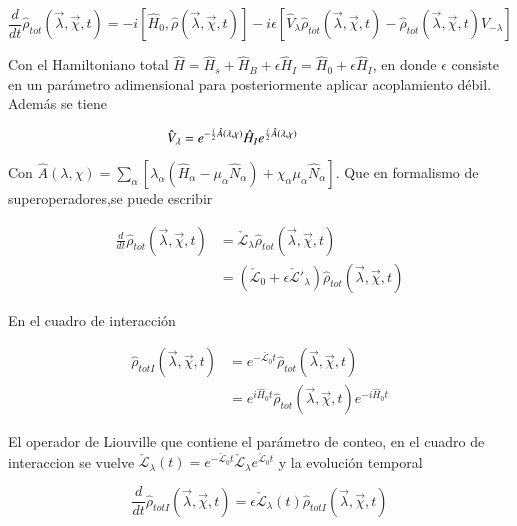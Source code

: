 \begin{equation*}
    \frac{d}{dt}\hat{\rho}_{tot}(\vec{\lambda},\vec{\chi},t) = -i[\hat{H}_{0},\hat{\rho}(\vec{\lambda},\vec{\chi},t)] - i\epsilon[\hat{V}_{\lambda} \hat{\rho}_{tot}(\vec{\lambda},\vec{\chi},t) - \hat{\rho}_{tot}(\vec{\lambda},\vec{\chi},t)\hat{V}_{-\lambda}]
\end{equation*}

Con el Hamiltoniano total $\hat{H} = \hat{H}_{s} + \hat{H}_{B} + \epsilon \hat{H}_{I} = \hat{H}_{0} + \epsilon \hat{H}_{I}$, en donde $\epsilon$ consiste en un parámetro adimensional para posteriormente aplicar acoplamiento débil. Además se tiene

\begin{equation*}
    \hat{V}_{\lambda} = e^{-\frac{i}{2}\hat{A}(\lambda,\chi)}\hat{H}_{I}e^{\frac{i}{2}\hat{A}(\lambda,\chi)} \hspace{14mm}  
\end{equation*}

Con $\hat{A}(\lambda,\chi) = \sum_{\alpha}[\lambda_{\alpha}(\hat{H}_{\alpha} - \mu_{\alpha}\hat{N}_{\alpha}) + \chi_{\alpha}\mu_{\alpha}\hat{N}_{\alpha} ]$. Que en formalismo de superoperadores,se puede escribir

\begin{align*}
    \frac{d}{dt}\hat{\rho}_{tot}(\vec{\lambda},\vec{\chi},t) & = \check{\mathcal{L}}_{\lambda}\hat{\rho}_{tot}(\vec{\lambda},\vec{\chi},t) \\  
        & = (\check{\mathcal{L}}_{0} + \epsilon \check{\mathcal{L}}'_{\lambda} )\hat{\rho}_{tot}(\vec{\lambda},\vec{\chi},t) 
\end{align*}

En el cuadro de interacción 

\begin{align*}
    \hat{\rho}_{totI}(\vec{\lambda},\vec{\chi},t) & = e^{-\check{\mathcal{L}_{0}}t}\hat{\rho}_{tot}(\vec{\lambda},\vec{\chi},t) \\
    & = e^{i\hat{H}_{0}t}\hat{\rho}_{tot}(\vec{\lambda},\vec{\chi},t)e^{-i\hat{H}_{0}t}
\end{align*}

El operador de Liouville que contiene el parámetro de conteo, en el cuadro de interaccion se vuelve $\check{\mathcal{L}}_{\lambda}(t) = e^{-\check{\mathcal{L}}_{0}t}\check{\mathcal{L}}_{\lambda}e^{\check{\mathcal{L}}_{0}t}$ y la evolución temporal

\begin{equation}
    \frac{d}{dt}\hat{\rho}_{totI}(\vec{\lambda},\vec{\chi},t) = \epsilon \check{\mathcal{L}}_{\lambda}(t)\hat{\rho}_{totI}(\vec{\lambda},\vec{\chi},t)
 \label{sec2FCS:evolution}
\end{equation}

